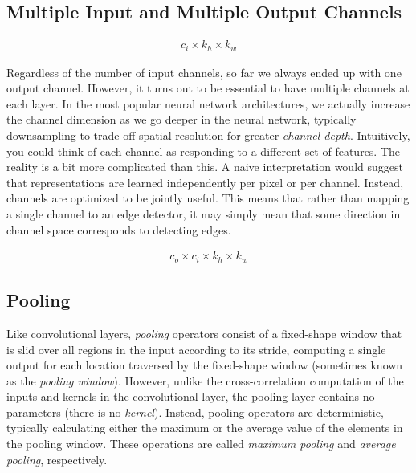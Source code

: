 \documentclass[a4paper,12pt]{article}
\theoremstyle{definition}
\begin{document}
\subsection{Multiple Input and Multiple Output Channels}

\begin{equation*}
    \begin{aligned}
        c_i\times k_h\times k_w
    \end{aligned}
\end{equation*}

Regardless of the number of input channels, so far we always ended up with one output channel. However, it turns out to be essential to have multiple channels 
at each layer. In the most popular neural network architectures, we actually increase the channel dimension as we go deeper in the neural network, typically downsampling to trade off spatial 
resolution for greater \emph{channel depth}. Intuitively, you could think of each channel as responding to a different set of features. The reality is a bit more complicated than this. 
A naive interpretation would suggest that representations are learned independently per pixel or per channel. Instead, channels are optimized to be jointly useful. This means that rather 
than mapping a single channel to an edge detector, it may simply mean that some direction in channel space corresponds to detecting edges.

\begin{equation*}
    \begin{aligned}
        c_o\times c_i\times k_h\times k_w
    \end{aligned}
\end{equation*}

\subsection{Pooling}
Like convolutional layers, \emph{pooling} operators consist of a fixed-shape window that is slid over all regions in the input according to its stride, computing a single 
output for each location traversed by the fixed-shape window (sometimes known as the \emph{pooling window}). However, unlike the cross-correlation computation of the inputs and kernels 
in the convolutional layer, the pooling layer contains no parameters (there is no \emph{kernel}). Instead, pooling operators are deterministic, typically calculating either the maximum 
or the average value of the elements in the pooling window. These operations are called \emph{maximum pooling} and \emph{average pooling}, respectively.
\end{document}
